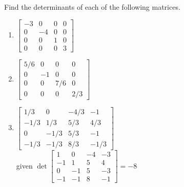 \begin{exercise}  
Find the determinants of each of the following matrices.
\begin{enumerate}
\item \(\begin{bmatrix} -3&0&0&0
\\0&-4&0&0
\\0&0&1&0
\\0&0&0&3 \end{bmatrix}\)


\item \(\begin{bmatrix} 5/6&0&0&0
\\0&-1&0&0
\\0&0&7/6&0
\\0&0&0&2/3 \end{bmatrix}\)


\item \(\begin{bmatrix} 1/3&0&-4/3&-1
\\-1/3&1/3&5/3&4/3
\\0&-1/3&5/3&-1
\\-1/3&-1/3&8/3&-1/3 \end{bmatrix}\)
\\given \(\det\begin{bmatrix} 1&0&-4&-3
\\-1&1&5&4
\\0&-1&5&-3
\\-1&-1&8&-1 \end{bmatrix}= -8 \)


\end{enumerate}
\end{exercise}
